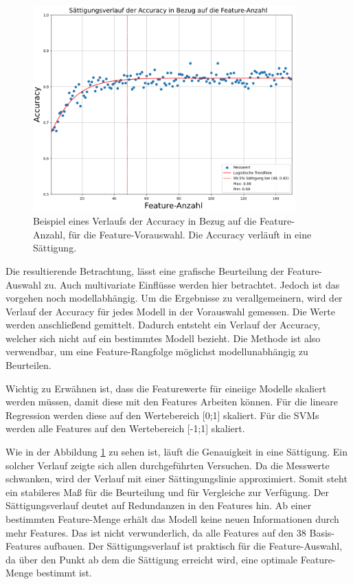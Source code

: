 \begin{figure}[htb]
    \centering
    \includegraphics[width=0.9\textwidth]{img/Plots/bsp Accuracy verlauf.png}
    \caption[Beispiel eines Verlaufs der Accuracy in Bezug auf die Feature-Anzahl.]{Beispiel eines Verlaufs der Accuracy in Bezug auf die Feature-Anzahl, für die Feature-Vorauswahl. Die Accuracy verläuft in eine Sättigung.}
    \label{fig:bspSättAccu}
\end{figure}

Die resultierende Betrachtung, lässt eine grafische Beurteilung der Feature-Auswahl zu. Auch multivariate Einflüsse werden hier betrachtet. Jedoch ist das vorgehen noch modellabhängig. Um die Ergebnisse zu verallgemeinern, wird der Verlauf der Accuracy für jedes Modell in der Vorauswahl gemessen. Die Werte werden anschließend gemittelt. Dadurch entsteht ein Verlauf der Accuracy, welcher sich nicht auf ein bestimmtes Modell bezieht. Die Methode ist also verwendbar, um eine Feature-Rangfolge möglichst modellunabhängig zu Beurteilen.\par

Wichtig zu Erwähnen ist, dass die Featurewerte für eineiige Modelle skaliert werden müssen, damit diese mit den Features Arbeiten können. Für die lineare Regression werden diese auf den Wertebereich [0;1] skaliert. Für die SVMs werden alle Features auf den Wertebereich [-1;1] skaliert.\par

Wie in der Abbildung \ref{fig:bspSättAccu} zu sehen ist, läuft die Genauigkeit in eine Sättigung. Ein solcher Verlauf zeigte sich allen durchgeführten Versuchen. Da die Messwerte schwanken, wird der Verlauf mit einer Sättingungslinie approximiert. Somit steht ein stabileres Maß für die Beurteilung und für Vergleiche zur Verfügung. Der Sättigungsverlauf deutet auf Redundanzen in den Features hin. Ab einer bestimmten Feature-Menge erhält das Modell keine neuen Informationen durch mehr Features. Das ist nicht verwunderlich, da alle Features auf den 38 Basis-Features aufbauen. Der Sättigungsverlauf ist praktisch für die Feature-Auswahl, da über den Punkt ab dem die Sättigung erreicht wird, eine optimale Feature-Menge bestimmt ist. \par

